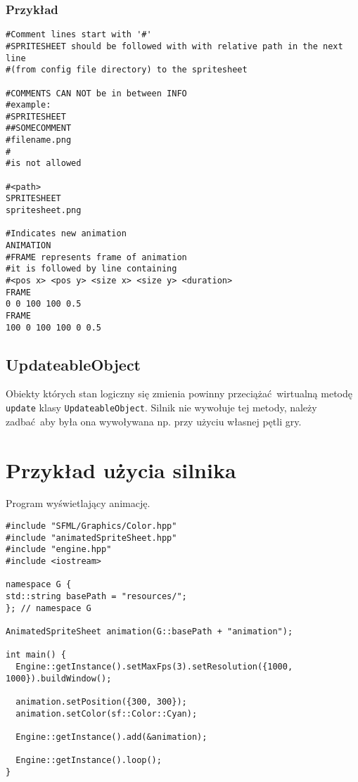 \documentclass[11pt]{article}
\begin{document}
\subsubsection{Przykład}
\label{sec:orgb4945a1}
\begin{verbatim}
#Comment lines start with '#'
#SPRITESHEET should be followed with with relative path in the next line
#(from config file directory) to the spritesheet

#COMMENTS CAN NOT be in between INFO
#example:
#SPRITESHEET
##SOMECOMMENT
#filename.png
#
#is not allowed

#<path>
SPRITESHEET
spritesheet.png

#Indicates new animation
ANIMATION
#FRAME represents frame of animation
#it is followed by line containing
#<pos x> <pos y> <size x> <size y> <duration>
FRAME
0 0 100 100 0.5
FRAME
100 0 100 100 0 0.5
\end{verbatim}
\subsection{UpdateableObject}
\label{sec:orga439a14}
Obiekty których stan logiczny się zmienia powinny przeciążać wirtualną metodę \texttt{update} klasy \texttt{UpdateableObject}.
Silnik nie wywołuje tej metody, należy zadbać aby była ona wywoływana np. przy użyciu własnej pętli gry.
\section{Przykład użycia silnika}
\label{sec:orgdd7d2f0}
Program wyświetlający animację.

\begin{verbatim}
#include "SFML/Graphics/Color.hpp"
#include "animatedSpriteSheet.hpp"
#include "engine.hpp"
#include <iostream>

namespace G {
std::string basePath = "resources/";
}; // namespace G

AnimatedSpriteSheet animation(G::basePath + "animation");

int main() {
  Engine::getInstance().setMaxFps(3).setResolution({1000, 1000}).buildWindow();

  animation.setPosition({300, 300});
  animation.setColor(sf::Color::Cyan);

  Engine::getInstance().add(&animation);

  Engine::getInstance().loop();
}
\end{verbatim}
\end{document}
